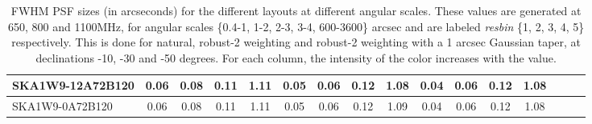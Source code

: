 \begin{table}[!htp]
{{\begin{tabular}{|lccccc||ccccc||ccccc|}
SKA1W9-12A72B120 & 0.06 \cellcolor{blue!60.00} & 0.08 \cellcolor{red!20.90} & 0.11 \cellcolor{green!18.00} & 1.11 \cellcolor{orange!31.58} & 0.05 \cellcolor{blue!49.50} & 0.06 \cellcolor{red!19.62} & 0.12 \cellcolor{green!18.00} & 1.08 \cellcolor{orange!23.83} & 0.04 \cellcolor{blue!18.00} & 0.06 \cellcolor{red!18.00} & 0.12 \cellcolor{green!18.00} & 1.08 \cellcolor{orange!29.89}\\ \hline 
SKA1W9-0A72B120 & 0.06 \cellcolor{blue!60.00} & 0.08 \cellcolor{red!18.00} & 0.11 \cellcolor{green!21.77} & 1.11 \cellcolor{orange!60.00} & 0.05 \cellcolor{blue!60.00} & 0.06 \cellcolor{red!18.00} & 0.12 \cellcolor{green!44.25} & 1.09 \cellcolor{orange!60.00} & 0.04 \cellcolor{blue!18.00} & 0.06 \cellcolor{red!18.00} & 0.12 \cellcolor{green!60.00} & 1.08 \cellcolor{orange!60.00}\tabularnewline \hline 
\end{tabular}}\hfil 

\caption{FWHM PSF sizes (in arcseconds) for the different layouts at different angular scales. These values are generated at 650, 800 and 1100MHz, for angular scales \{0.4-1, 1-2, 2-3, 3-4, 600-3600\} arcsec and are labeled {\it resbin} \{1, 2, 3, 4, 5\} respectively. This is done for natural, robust-2 weighting and robust-2 weighting with a 1 arcsec Gaussian taper, at declinations -10, -30 and -50 degrees. For each column, the intensity of the color increases with the value.}\label{tab:psf_mean}}
 \end{table}